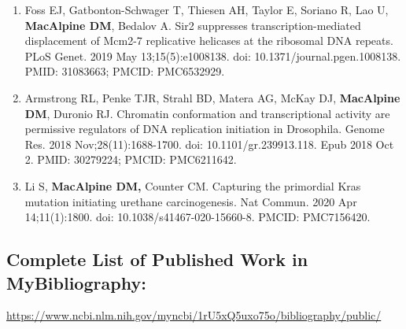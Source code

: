 \documentclass{nihbiosketch}
\begin{document}
\begin{enumerate}
\begin{enumerate}
\item Foss EJ, Gatbonton-Schwager T, Thiesen AH, Taylor E, Soriano R, Lao U, \textbf{MacAlpine DM}, Bedalov A. Sir2 suppresses transcription-mediated displacement of Mcm2-7 replicative helicases at the ribosomal DNA repeats. PLoS Genet. 2019 May 13;15(5):e1008138. doi: 10.1371/journal.pgen.1008138. PMID: 31083663; PMCID: PMC6532929.

\item Armstrong RL, Penke TJR, Strahl BD, Matera AG, McKay DJ, \textbf{MacAlpine DM}, Duronio RJ. Chromatin conformation and transcriptional activity are permissive regulators of DNA replication initiation in Drosophila. Genome Res. 2018 Nov;28(11):1688-1700. doi: 10.1101/gr.239913.118. Epub 2018 Oct 2. PMID: 30279224; PMCID: PMC6211642.


\item Li S, \textbf{MacAlpine DM,} Counter CM. Capturing the primordial Kras mutation initiating urethane carcinogenesis. Nat Commun. 2020 Apr 14;11(1):1800. doi: 10.1038/s41467-020-15660-8. PMCID: PMC7156420.

\end{enumerate}



\end{enumerate}

\subsection*{Complete List of Published Work in MyBibliography:} 
\medskip

\url{https://www.ncbi.nlm.nih.gov/myncbi/1rU5xQ5uxo75o/bibliography/public/}


\end{document}
